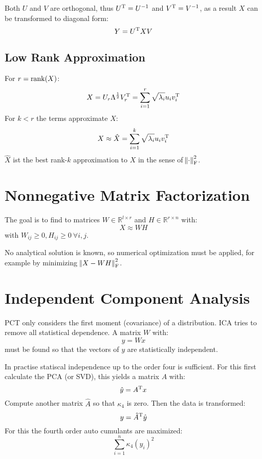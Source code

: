 Both $U$ and $V$ are orthogonal, thus $U^\text{T} = U^{-1}$ and $V^\text{T} = V^{-1}$, as a result $X$ can be transformed to diagonal form:
\begin{equation*}
    Y = U^\text{T} X V
\end{equation*}

\subsection{Low Rank Approximation}
For $r = \operatorname*{rank}(X)$:
\begin{equation*}
    X = U_r \Lambda^\frac{1}{2} V^\text{T}_r = \sum_{i=1}^r \sqrt{\lambda_i} u_i v_i^\text{T}
\end{equation*}
For $k < r$ the terms approximate $X$:
\begin{equation*}
    X \approx \hat{X} = \sum_{i=1}^k \sqrt{\lambda_i} u_i v_i^\text{T}
\end{equation*}
$\hat{X}$ ist the best rank-$k$ approximation to $X$ in the sense of $\norm{\cdot}_\text{F}^2$.

\section{Nonnegative Matrix Factorization}
The goal is to find to matrices $W \in \mathbb{R}^{l \times r}$ and $H \in \mathbb{R}^{r \times n}$ with:
\begin{equation*}
    X \approx W H
\end{equation*}
with $W_{ij} \geq 0, H_{ij} \geq 0\ \forall i,j$.

No analytical solution is known, so numerical optimization must be applied, for example by minimizing $\norm{X-WH}^2_\text{F}$.

\section{Independent Component Analysis}
PCT only considers the first moment (covariance) of a distribution. ICA tries to remove all statistical dependence. A matrix $W$ with:
\begin{equation*}
    y = Wx
\end{equation*}
must be found so that the vectors of $y$ are statistically independent.

In practise statiscal independence up to the order four is sufficient. For this first calculate the PCA (or SVD), this yields a matrix $A$ with:
\begin{equation*}
    \hat{y} = A^\text{T} x
\end{equation*}
Compute another matrix $\hat{A}$ so that $\kappa_4$ is zero. Then the data is transformed:
\begin{equation*}
    y = \hat{A}^\text{T} \hat{y}
\end{equation*}
For this the fourth order auto cumulants are maximized:
\begin{equation*}
    \sum_{i=1}^n \kappa_4(y_i)^2
\end{equation*}

